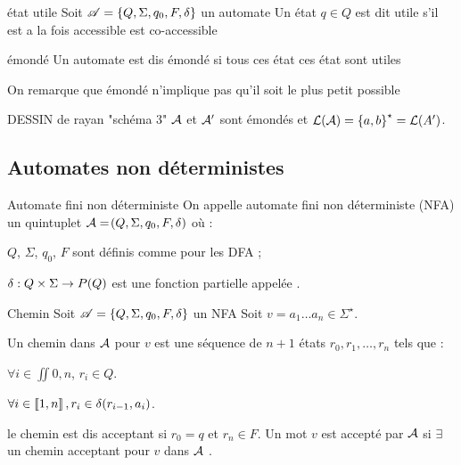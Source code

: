 \documentclass[a4paper,french,bookmarks]{book}
\begin{document}
    
    \begin{definition}{état utile}
        Soit $\mathscr{A} = \left\{Q, \Sigma, q_0, F, \delta\right\}$ un automate
        Un état $q \in Q$ est dit utile s'il est a la fois accessible est co-accessible 
        
    \end{definition}
    \begin{definition}{émondé}{}
        Un automate est dis émondé si tous ces état ces état sont utiles 
    \end{definition}
    On remarque que émondé n'implique pas qu'il soit le plus petit possible  
    
    \begin{example}{}{}
        \text{}\newline
        DESSIN de rayan "schéma 3"  
        \newline 
        $\mathcal{A}$ et $\mathcal{A}'$ sont émondés et $\mathcal{L}\!\left(\mathcal{A}\right) = \left\{a, b\right\}^\star = \mathcal{L}\!\left(A'\right)$.
    \end{example}
    
    \subsection{Automates non déterministes}
    
    \begin{definition}{Automate fini non déterministe}
        On appelle automate fini non déterministe (NFA) un quintuplet $\mathcal{A} = \!\left(Q, \Sigma, q_0, F, \delta\right)$ où :
        \begin{enumerate}
            \itast $Q$, $\Sigma$, $q_0$, $F$ sont définis comme pour les DFA ;
            
            \itast $\delta : Q \times \Sigma \to P\!\left(Q\right)$ est une fonction partielle appelée .
        \end{enumerate}
    \end{definition}

    \begin{definition}{Chemin}{}
        Soit $\mathscr{A} = \left\{Q, \Sigma, q_0, F, \delta\right\}$ un NFA 
        Soit $v = a_1 \dots a_n \in \Sigma^\star$.
        
        Un chemin dans $\mathcal{A}$ pour $v$ est une séquence de $n+1$ états $r_0, r_1, \dots, r_n$ tels que :
        
        \begin{enumerate}
            \itast $\forall i \in \iint{0, n}$, $r_i \in Q$.
            
            \itast $\forall i \in \left\llbracket1, n\right\rrbracket, r_i \in \delta\!\left(r_{i-1}, a_i\right)$.
        \end{enumerate}
    
    le chemin est dis acceptant si $r_0=q$ et $r_n \in F$.
    Un mot $v$  est accepté par $\mathcal{A}$ si $\exists$ un chemin acceptant pour $v$ dans $\mathcal{A}$ . 
    
    
    
    \end{definition}
    
\end{document}
